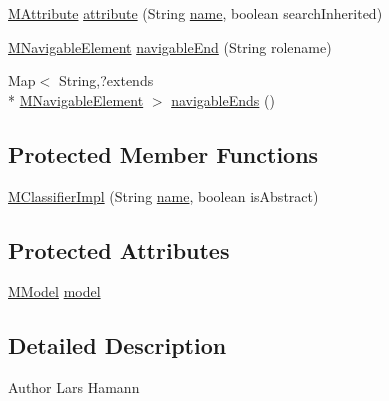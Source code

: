 \begin{DoxyCompactItemize}
\item 
\hyperlink{classorg_1_1tzi_1_1use_1_1uml_1_1mm_1_1_m_attribute}{M\-Attribute} \hyperlink{classorg_1_1tzi_1_1use_1_1uml_1_1mm_1_1_m_classifier_impl_a2082418abbb45fcc41c7a2610eb3203f}{attribute} (String \hyperlink{classorg_1_1tzi_1_1use_1_1uml_1_1mm_1_1_m_model_element_impl_ac9997b04c10d247c21c22d431d99400d}{name}, boolean search\-Inherited)
\item 
\hyperlink{interfaceorg_1_1tzi_1_1use_1_1uml_1_1mm_1_1_m_navigable_element}{M\-Navigable\-Element} \hyperlink{classorg_1_1tzi_1_1use_1_1uml_1_1mm_1_1_m_classifier_impl_a784956ba463d286528a798a6251fc153}{navigable\-End} (String rolename)
\item 
Map$<$ String,?extends \\*
\hyperlink{interfaceorg_1_1tzi_1_1use_1_1uml_1_1mm_1_1_m_navigable_element}{M\-Navigable\-Element} $>$ \hyperlink{classorg_1_1tzi_1_1use_1_1uml_1_1mm_1_1_m_classifier_impl_af5cf7b52606650b17df33a1a23979f53}{navigable\-Ends} ()
\end{DoxyCompactItemize}
\subsection*{Protected Member Functions}
\begin{DoxyCompactItemize}
\item 
\hyperlink{classorg_1_1tzi_1_1use_1_1uml_1_1mm_1_1_m_classifier_impl_a7710994976ccfda56959f38e312572e0}{M\-Classifier\-Impl} (String \hyperlink{classorg_1_1tzi_1_1use_1_1uml_1_1mm_1_1_m_model_element_impl_ac9997b04c10d247c21c22d431d99400d}{name}, boolean is\-Abstract)
\end{DoxyCompactItemize}
\subsection*{Protected Attributes}
\begin{DoxyCompactItemize}
\item 
\hyperlink{classorg_1_1tzi_1_1use_1_1uml_1_1mm_1_1_m_model}{M\-Model} \hyperlink{classorg_1_1tzi_1_1use_1_1uml_1_1mm_1_1_m_classifier_impl_a12a5d3d4ce833383eca8ef43a73e2484}{model}
\end{DoxyCompactItemize}


\subsection{Detailed Description}
\begin{DoxyAuthor}{Author}
Lars Hamann 
\end{DoxyAuthor}



